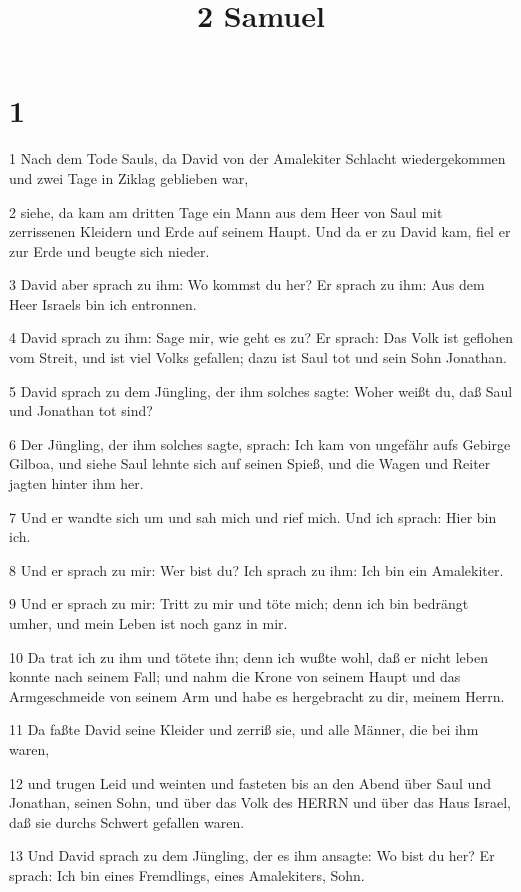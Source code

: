 

\title{2 Samuel}


\chapter{1}

\par 1 Nach dem Tode Sauls, da David von der Amalekiter Schlacht wiedergekommen und zwei Tage in Ziklag geblieben war,
\par 2 siehe, da kam am dritten Tage ein Mann aus dem Heer von Saul mit zerrissenen Kleidern und Erde auf seinem Haupt. Und da er zu David kam, fiel er zur Erde und beugte sich nieder.
\par 3 David aber sprach zu ihm: Wo kommst du her? Er sprach zu ihm: Aus dem Heer Israels bin ich entronnen.
\par 4 David sprach zu ihm: Sage mir, wie geht es zu? Er sprach: Das Volk ist geflohen vom Streit, und ist viel Volks gefallen; dazu ist Saul tot und sein Sohn Jonathan.
\par 5 David sprach zu dem Jüngling, der ihm solches sagte: Woher weißt du, daß Saul und Jonathan tot sind?
\par 6 Der Jüngling, der ihm solches sagte, sprach: Ich kam von ungefähr aufs Gebirge Gilboa, und siehe Saul lehnte sich auf seinen Spieß, und die Wagen und Reiter jagten hinter ihm her.
\par 7 Und er wandte sich um und sah mich und rief mich. Und ich sprach: Hier bin ich.
\par 8 Und er sprach zu mir: Wer bist du? Ich sprach zu ihm: Ich bin ein Amalekiter.
\par 9 Und er sprach zu mir: Tritt zu mir und töte mich; denn ich bin bedrängt umher, und mein Leben ist noch ganz in mir.
\par 10 Da trat ich zu ihm und tötete ihn; denn ich wußte wohl, daß er nicht leben konnte nach seinem Fall; und nahm die Krone von seinem Haupt und das Armgeschmeide von seinem Arm und habe es hergebracht zu dir, meinem Herrn.
\par 11 Da faßte David seine Kleider und zerriß sie, und alle Männer, die bei ihm waren,
\par 12 und trugen Leid und weinten und fasteten bis an den Abend über Saul und Jonathan, seinen Sohn, und über das Volk des HERRN und über das Haus Israel, daß sie durchs Schwert gefallen waren.
\par 13 Und David sprach zu dem Jüngling, der es ihm ansagte: Wo bist du her? Er sprach: Ich bin eines Fremdlings, eines Amalekiters, Sohn.
